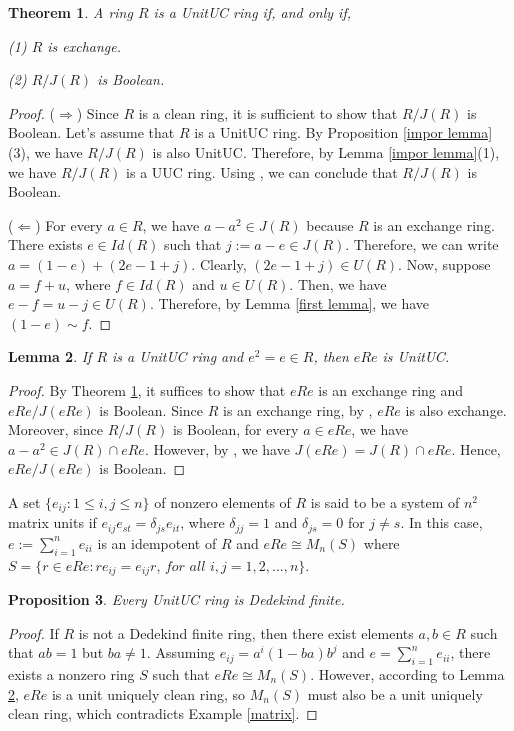 \documentclass[12pt]{amsart}
\newtheorem{theorem}{Theorem}[section]
\newtheorem{proposition}[theorem]{Proposition}
\newtheorem{lemma}[theorem]{Lemma}
\theoremstyle{definition}
\begin{document}
\begin{theorem}\label{thm imp}
    A ring $R$ is a   UnitUC ring if, and only if,
    
(1) $R$ is exchange.

(2) $R/J(R)$ is Boolean.
\end{theorem}
\begin{proof}
($\Rightarrow$) Since $R$ is a clean ring, it is sufficient to show that $R/J(R)$ is Boolean. Let's assume that $R$ is a   UnitUC ring. By Proposition \ref{impor lemma}(3), we have $R/J(R)$ is also   UnitUC. Therefore, by Lemma \ref{impor lemma}(1), we have $R/J(R)$ is a UUC ring. Using \cite[Theorem 3.1]{zhou1}, we can conclude that $R/J(R)$ is Boolean.

($\Leftarrow$) For every $a \in R$, we have $a - a^2 \in J(R)$ because $R$ is an exchange ring. There exists $e \in Id(R)$ such that $j := a - e \in J(R)$. Therefore, we can write $a = (1 - e) + (2e - 1 + j)$. Clearly, $(2e - 1 + j) \in U(R)$. Now, suppose $a = f + u$, where $f \in Id(R)$ and $u \in U(R)$. Then, we have $e - f = u - j \in U(R)$. Therefore, by Lemma \ref{first lemma}, we have $(1 - e) \sim f$.
\end{proof}

\begin{lemma} \label{corner ring}
    If $R$ is a  UnitUC ring and $e^2 = e \in R$, then $eRe$ is   UnitUC.
\end{lemma}
\begin{proof}
By Theorem \ref{thm imp}, it suffices to show that $eRe$ is an exchange ring and $eRe/J(eRe)$ is Boolean. Since $R$ is an exchange ring, by \cite[Corollary 2.6]{nicolson}, $eRe$ is also exchange. Moreover, since $R/J(R)$ is Boolean, for every $a \in eRe$, we have $a - a^2 \in J(R) \cap 
 eRe$. However, by \cite[Theorem 21.10]{lam2001first}, we have $J(eRe) = J(R) \cap eRe$. Hence, $eRe/J(eRe)$ is Boolean.
\end{proof}



A set $\{e_{ij} : 1 \le i, j \le n\}$ of nonzero elements of $R$ is said to be a system of $n^2$ matrix units if $e_{ij}e_{st} = \delta_{js}e_{it}$, where $\delta_{jj} = 1$ and $\delta_{js} = 0$ for $j \neq s$. In this case, $e := \sum_{i=1}^{n} e_{ii}$ is an idempotent of $R$ and $eRe \cong M_n(S)$ where $S = \{r \in eRe : re_{ij} = e_{ij}r\textit{, for all } i, j = 1, 2, . . . , n\}$.

\begin{proposition} \label{dedkind finite}
    Every  UnitUC ring is Dedekind finite.
\end{proposition}
\begin{proof}
    If $R$ is not a Dedekind finite ring, then there exist elements $a, b \in R$ such that $ab = 1$ but $ba \neq 1$. Assuming $e_{ij} = a^i(1-ba)b^j$ and $e =\sum_{i=1}^{n}e_{ii}$, there exists a nonzero ring $S$ such that $eRe \cong M_n(S)$. However, according to Lemma \ref{corner ring}, $eRe$ is a unit uniquely clean ring, so $M_n(S)$ must also be a unit uniquely clean ring, which contradicts Example \ref{matrix}.
\end{proof}
\end{document}
